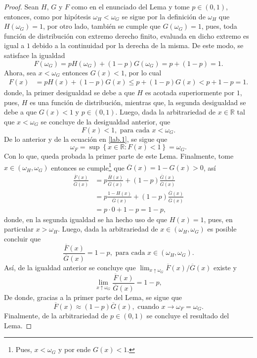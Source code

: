 \documentclass[10.5pt,notitlepage]{article}
\newcommand{\RR}{\mathbb{R}}
\newcommand{\kis}[1]{\left\{ #1 \right\}}
\theoremstyle{plain}
\begin{document}
\begin{proof}
Sean \(H\), \(G\) y \(F\) como en el enunciado del Lema y tome \(p \in (0,1)\), entonces, como por hipótesis \(\omega_{H} < \omega_{G}\) se sigue por la definición de \(\omega_{H}\) que \(H(\omega_{G}) = 1\), por otro lado, también se cumple que \(G(\omega_{G}) = 1\), pues, toda función de distribución con extremo derecho finito, evaluada en dicho extremo es igual a \(1\) debido a la continuidad por la derecha de la misma. De este modo, se satisface la igualdad 
\begin{equation}\label{lab.1}
    F(\omega_{G}) = pH(\omega_{G}) + (1 - p)G(\omega_{G}) = p + (1 - p) = 1.
\end{equation}
Ahora, sea \(x < \omega_{G}\) entonces \(G(x) < 1\), por lo cual 
\begin{align*}
    F(x) &= pH(x) + (1-p)G(x) \leq p + (1 - p)G(x) < p+ 1 - p = 1. 
\end{align*}
donde, la primer desigualdad se debe a que \(H\) es acotada superiormente por \(1\), pues, \(H\) es una función de distribución, mientras que, la segunda desigualdad se debe a que \(G(x)< 1\) y \(p \in(0,1)\). Luego, dada la arbitrariedad de \(x\in \RR\) tal que \(x <\omega_{G}\) se concluye de la desigualdad anterior, que 
\[
F(x) < 1, \text{ para cada } x < \omega_{G}.
\]
De lo anterior y de la ecuación en \eqref{lab.1}, se sigue que 
\[
\omega_{F} = \sup\kis{x\in \RR: F(x) < 1} = \omega_{G}.
\]
Con lo que, queda probada la primer parte de este Lema. Finalmente, tome \(x\in (\omega_H, \omega_{G})\) entonces se cumple\footnote{Pues, \(x < \omega_{G}\) y por ende \(G(x) <1\).} que \(\overline{G}(x) = 1- G(x) > 0\), así 
\begin{align*}
    \frac{\overline{F}(x)}{\overline{G}(x)} &= p\frac{\overline{H}(x)}{\overline{G}(x)} + (1 - p)\frac{\overline{G}(x)}{\overline{G}(x)}\\ 
                                            &= p\frac{1 - H(x)}{\overline{G}(x)} + (1 - p)\frac{\overline{G}(x)}{\overline{G}(x)}\\
                                            &=p\cdot 0 + 1 - p = 1-p,
\end{align*}
donde, en la segunda igualdad se ha hecho uso de que \(H(x) = 1\), pues, en particular \(x> \omega_{H}\). Luego, dada la arbitrariedad de \(x\in (\omega_H, \omega_{G})\) es posible concluir que 
\[
\frac{\overline{F}(x)}{\overline{G}(x)} = 1-p,\text{ para cada }x\in (\omega_H, \omega_{G}). 
\]
Así, de la igualdad anterior se concluye que \(\lim_{x \uparrow \omega_{G}}\overline{F}(x)/\overline{G}(x)\) existe y  
\[
\lim_{x\uparrow \omega_{G}}\frac{\overline{F}(x)}{\overline{G}(x)} = 1-p,
\]
De donde, gracias a la primer parte del Lema, se sigue que 
\[
\overline{F}(x) \approx (1 - p) \overline{G}(x), \text{ cuando } x \to \omega_{F} = \omega_{G}.
\]
Finalmente, de la arbitrariedad de \(p \in (0,1)\) se concluye el resultado del Lema. 
\end{proof}
\end{document}

